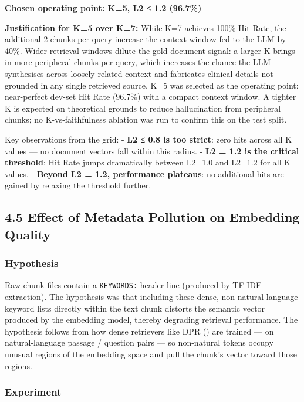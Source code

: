 \documentclass[
  american,
  a4paper,
]{article}
\begin{document}
\textbf{Chosen operating point: K=5, L2 ≤ 1.2 (96.7\%)}

\textbf{Justification for K=5 over K=7:} While K=7 achieves 100\% Hit
Rate, the additional 2 chunks per query increase the context window fed
to the LLM by 40\%. Wider retrieval windows dilute the gold-document
signal: a larger K brings in more peripheral chunks per query, which
increases the chance the LLM synthesises across loosely related context
and fabricates clinical details not grounded in any single retrieved
source. K=5 was selected as the operating point: near-perfect dev-set
Hit Rate (96.7\%) with a compact context window. A tighter K is expected
on theoretical grounds to reduce hallucination from peripheral chunks;
no K-vs-faithfulness ablation was run to confirm this on the test split.

Key observations from the grid: - \textbf{L2 ≤ 0.8 is too strict}: zero
hits across all K values --- no document vectors fall within this
radius. - \textbf{L2 = 1.2 is the critical threshold}: Hit Rate jumps
dramatically between L2=1.0 and L2=1.2 for all K values. -
\textbf{Beyond L2 = 1.2, performance plateaus}: no additional hits are
gained by relaxing the threshold further.

\subsection{4.5 Effect of Metadata Pollution on Embedding
Quality}\label{effect-of-metadata-pollution-on-embedding-quality}

\subsubsection{Hypothesis}\label{hypothesis}

Raw chunk files contain a \texttt{KEYWORDS:} header line (produced by
TF-IDF extraction). The hypothesis was that including these dense,
non-natural language keyword lists directly within the text chunk
distorts the semantic vector produced by the embedding model, thereby
degrading retrieval performance. The hypothesis follows from how dense
retrievers like DPR () are trained --- on natural-language passage / question pairs ---
so non-natural tokens occupy unusual regions of the embedding space and
pull the chunk's vector toward those regions.

\subsubsection{Experiment}\label{experiment}
\end{document}
